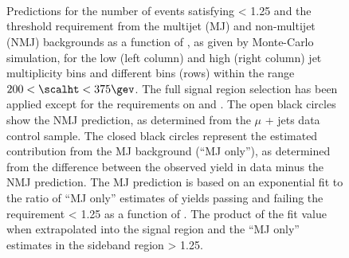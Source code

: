 \begin{figure}[!h]
  \centering
   \\
   \\
   \\
  \caption{Predictions for the number of events satisfying \mhtmet <
    1.25 and the threshold requirement \alphatcut from the multijet
    (MJ) and non-multijet (NMJ) backgrounds as a function of
    \alphatcut, as given by Monte-Carlo simulation, for the low (left
    column) and high (right column) jet multiplicity bins and
    different \scalht bins (rows) within the range $200 < \scalht <
    375\gev$. The full signal region selection has been applied except
    for the requirements on \mhtmet and \alphat. The open black
    circles show the NMJ prediction, as determined from the $\mu$ +
    jets data control sample. The closed black circles represent the
    estimated contribution from the MJ background (``MJ only''), as
    determined from the difference between the observed yield in data
    minus the NMJ prediction. The MJ prediction is based on an
    exponential fit to the ratio of ``MJ only'' estimates of yields
    passing and failing the requirement \mhtmet < 1.25 as a function
    of \alphat. The product of the fit value when extrapolated into
    the signal region and the ``MJ only'' estimates in the sideband
    region \mhtmet > 1.25. }
  \label{fig:}
\end{figure} 

